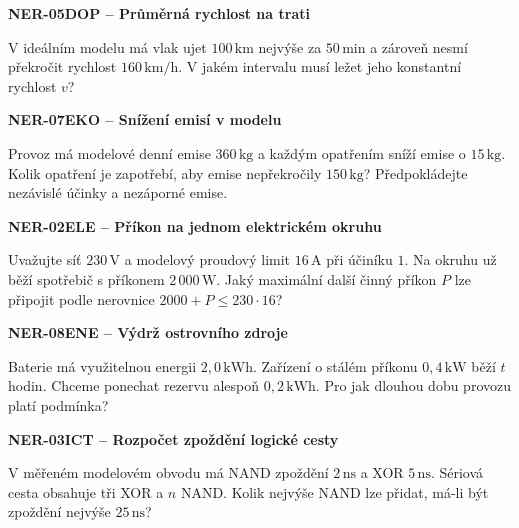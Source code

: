 \documentclass[11pt,a4paper]{article}
\begin{document}
\vspace{4mm}\par\noindent\dotfill\par\medskip
\par\medskip\noindent\textbf{NER-05}\quad\textbf{DOP -- Průměrná rychlost na trati}\par
V ideálním modelu má vlak ujet $100\,\mathrm{km}$ nejvýše za $50\,\mathrm{min}$ a zároveň nesmí překročit rychlost $160\,\mathrm{km/h}$. V jakém intervalu musí ležet jeho konstantní rychlost $v$?

\vspace{4mm}\par\noindent\dotfill\par\medskip
\par\medskip\noindent\textbf{NER-07}\quad\textbf{EKO -- Snížení emisí v modelu}\par
Provoz má modelové denní emise $360\,\mathrm{kg}$ a každým opatřením sníží emise o $15\,\mathrm{kg}$. Kolik opatření je zapotřebí, aby emise nepřekročily $150\,\mathrm{kg}$? Předpokládejte nezávislé účinky a nezáporné emise.

\vspace{4mm}\par\noindent\dotfill\par\medskip
\par\medskip\noindent\textbf{NER-02}\quad\textbf{ELE -- Příkon na jednom elektrickém okruhu}\par
Uvažujte síť $230\,\mathrm V$ a modelový proudový limit $16\,\mathrm A$ při účiníku $1$. Na okruhu už běží spotřebič s příkonem $2\,000\,\mathrm W$. Jaký maximální další činný příkon $P$ lze připojit podle nerovnice $2000+P\le230\cdot16$?

\vspace{4mm}\par\noindent\dotfill\par\medskip
\par\medskip\noindent\textbf{NER-08}\quad\textbf{ENE -- Výdrž ostrovního zdroje}\par
Baterie má využitelnou energii $2{,}0\,\mathrm{kWh}$. Zařízení o stálém příkonu $0{,}4\,\mathrm{kW}$ běží $t$ hodin. Chceme ponechat rezervu alespoň $0{,}2\,\mathrm{kWh}$. Pro jak dlouhou dobu provozu platí podmínka?

\vspace{4mm}\par\noindent\dotfill\par\medskip
\par\medskip\noindent\textbf{NER-03}\quad\textbf{ICT -- Rozpočet zpoždění logické cesty}\par
V měřeném modelovém obvodu má NAND zpoždění $2\,\mathrm{ns}$ a XOR $5\,\mathrm{ns}$. Sériová cesta obsahuje tři XOR a $n$ NAND. Kolik nejvýše NAND lze přidat, má-li být zpoždění nejvýše $25\,\mathrm{ns}$?
\end{document}
